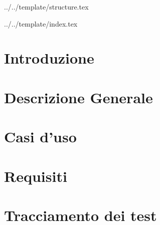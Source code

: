 

\def\DOCUMENTO{Analisi dei Requisiti}
\def\VERSIONE{3.0.0}

\def\DESCRIZIONE{Documento che descrive l'analisi dei requisiti e dei casi d'uso del gruppo \GRUPPO\ per il progetto \PROGETTO.}

\def\REDATTORE {Crespan Emanuele}
\def\VERIFICATORE {Agostinetto Matteo}
\def\RESPONSABILE {Suierica Bogdan}

\def\USO {Esterno}

\def\DISTRIBUZIONE {\GRUPPO{}\\ & \COMMITTENTE{}\\ & \PROPONENTE{}\\}

\def\DESCRIZIONE {Documento che descrive l'analisi dei requisiti e dei casi d'uso del gruppo \GRUPPO{} per il progetto \PROGETTO.}


\def\INDICE	{true}
\def\TABELLE {true}
\def\FIGURE {true}


 {../../template/structure.tex}



 {../../template/index.tex}


\section{Introduzione}

\newpage

\section{Descrizione Generale}

\newpage

\section{Casi d'uso}

\newpage

\section{Requisiti}

\newpage


\section{Tracciamento dei test}

\newpage



